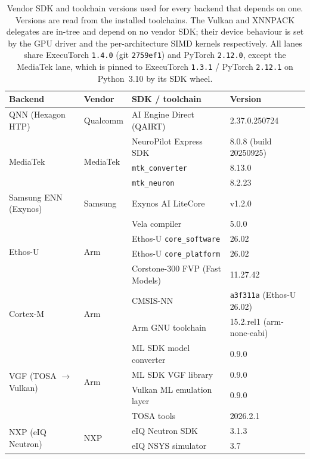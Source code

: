 \begin{table}[t]
\begin{table}[t]
\centering
\small
\caption{Vendor SDK and toolchain versions used for every backend that depends on one. Versions are
read from the installed toolchains. The Vulkan and XNNPACK delegates are in-tree and depend on no
vendor SDK; their device behaviour is set by the GPU driver and the per-architecture SIMD kernels
respectively. All lanes share ExecuTorch \texttt{1.4.0} (git \texttt{2759ef1}) and PyTorch
\texttt{2.12.0}, except the MediaTek lane, which is pinned to ExecuTorch \texttt{1.3.1} / PyTorch
\texttt{2.12.1} on Python~3.10 by its SDK wheel.}
\label{tab:sdk-versions}
\begin{tabular}{llll}
\toprule
Backend & Vendor & SDK / toolchain & Version \\
\midrule
QNN (Hexagon HTP) & Qualcomm & AI Engine Direct (QAIRT) & 2.37.0.250724 \\
\midrule
\multirow{3}{*}{MediaTek} & \multirow{3}{*}{MediaTek} & NeuroPilot Express SDK & 8.0.8 (build 20250925) \\
 & & \texttt{mtk\_converter} & 8.13.0 \\
 & & \texttt{mtk\_neuron} & 8.2.23 \\
\midrule
Samsung ENN (Exynos) & Samsung & Exynos AI LiteCore & v1.2.0 \\
\midrule
\multirow{4}{*}{Ethos-U} & \multirow{4}{*}{Arm} & Vela compiler & 5.0.0 \\
 & & Ethos-U \texttt{core\_software} & 26.02 \\
 & & Ethos-U \texttt{core\_platform} & 26.02 \\
 & & Corstone-300 FVP (Fast Models) & 11.27.42 \\
\midrule
\multirow{2}{*}{Cortex-M} & \multirow{2}{*}{Arm} & CMSIS-NN & \texttt{a3f311a} (Ethos-U 26.02) \\
 & & Arm GNU toolchain & 15.2.rel1 (arm-none-eabi) \\
\midrule
\multirow{4}{*}{VGF (TOSA $\rightarrow$ Vulkan)} & \multirow{4}{*}{Arm} & ML SDK model converter & 0.9.0 \\
 & & ML SDK VGF library & 0.9.0 \\
 & & Vulkan ML emulation layer & 0.9.0 \\
 & & TOSA tools & 2026.2.1 \\
\midrule
\multirow{2}{*}{NXP (eIQ Neutron)} & \multirow{2}{*}{NXP} & eIQ Neutron SDK & 3.1.3 \\
 & & eIQ NSYS simulator & 3.7 \\

\end{tabular}
\end{table}
\end{table}
